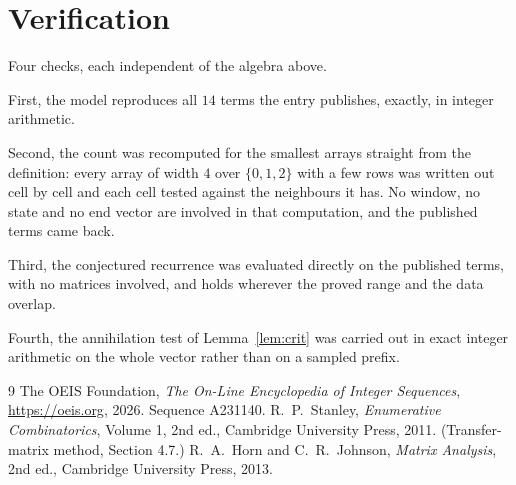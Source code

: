 \documentclass[11pt,a4paper]{article}
\theoremstyle{plain}
\theoremstyle{definition}
\begin{document}
\section{Verification}

Four checks, each independent of the algebra above.

First, the model reproduces all $14$ terms the entry publishes, exactly, in integer
arithmetic.

Second, the count was recomputed for the smallest arrays straight from the definition: every
array of width $4$ over $\{0,1,2\}$ with a few rows was written out cell by cell and each cell
tested against the neighbours it has. No window, no state and no end vector are involved in that
computation, and the published terms came back.

Third, the conjectured recurrence was evaluated directly on the published terms, with no
matrices involved, and holds wherever the proved range and the data overlap.

Fourth, the annihilation test of Lemma~\ref{lem:crit} was carried out in exact integer
arithmetic on the whole vector rather than on a sampled prefix.

\begin{thebibliography}{9}
 The OEIS Foundation, \emph{The On-Line Encyclopedia of Integer
Sequences}, \url{https://oeis.org}, 2026. Sequence A231140.
 R.~P.~Stanley, \emph{Enumerative Combinatorics}, Volume 1, 2nd ed.,
Cambridge University Press, 2011. (Transfer-matrix method, Section 4.7.)
 R.~A.~Horn and C.~R.~Johnson, \emph{Matrix Analysis}, 2nd ed., Cambridge
University Press, 2013.
\end{thebibliography}
\end{document}
